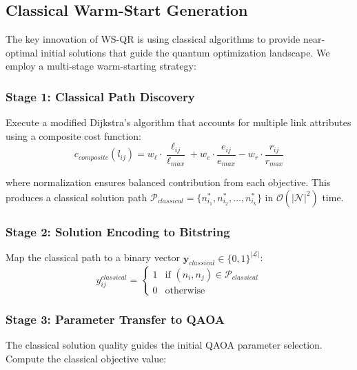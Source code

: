 \documentclass[lettersize,journal]{IEEEtran}
\begin{document}
\subsection{Classical Warm-Start Generation}
\label{subsec:warm_start_generation}

The key innovation of WS-QR is using classical algorithms to provide near-optimal initial solutions that guide the quantum optimization landscape. We employ a multi-stage warm-starting strategy:

\subsubsection{Stage 1: Classical Path Discovery}

Execute a modified Dijkstra's algorithm that accounts for multiple link attributes using a composite cost function:
\begin{equation}
c_{composite}(l_{ij}) = w_\ell \cdot \frac{\ell_{ij}}{\ell_{max}} + w_e \cdot \frac{e_{ij}}{e_{max}} - w_r \cdot \frac{r_{ij}}{r_{max}}
\label{eq:composite_cost}
\end{equation}

where normalization ensures balanced contribution from each objective. This produces a classical solution path $\mathcal{P}_{classical} = \{n_{i_1}^*, n_{i_2}^*, \ldots, n_{i_k}^*\}$ in $\mathcal{O}(|\mathcal{N}|^2)$ time.

\subsubsection{Stage 2: Solution Encoding to Bitstring}

Map the classical path to a binary vector $\mathbf{y}_{classical} \in \{0,1\}^{|\mathcal{L}|}$:
\begin{equation}
y_{ij}^{classical} = \begin{cases}
1 & \text{if } (n_i, n_j) \in \mathcal{P}_{classical} \\
0 & \text{otherwise}
\end{cases}
\label{eq:classical_bitstring}
\end{equation}

\subsubsection{Stage 3: Parameter Transfer to QAOA}

The classical solution quality guides the initial QAOA parameter selection. Compute the classical objective value:
\end{document}
